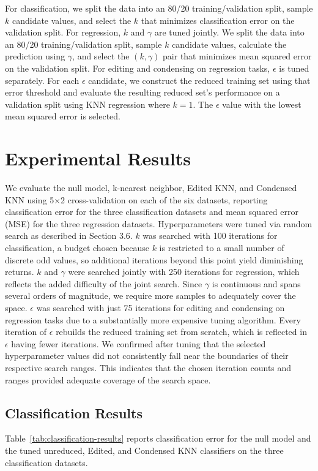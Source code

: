 \documentclass[twoside,11pt]{article}
\begin{document}
For classification, we split the data into an 80/20 training/validation split, sample $k$ candidate values, and select the $k$ that minimizes classification error on the validation split. For regression, $k$ and $\gamma$ are tuned jointly. We split the data into an 80/20 training/validation split, sample $k$ candidate values, calculate the prediction using $\gamma$, and select the $(k,\gamma)$ pair that minimizes mean squared error on the validation split. For editing and condensing on regression tasks, $\epsilon$ is tuned separately. For each $\epsilon$ candidate, we construct the reduced training set using that error threshold and evaluate the resulting reduced set's performance on a validation split using KNN regression where $k=1$. The $\epsilon$ value with the lowest mean squared error is selected.

\section{Experimental Results}
We evaluate the null model, k-nearest neighbor, Edited KNN, and Condensed KNN using 5$\times$2 cross-validation on each of the six datasets, reporting classification error for the three classification datasets and mean squared error (MSE) for the three regression datasets. Hyperparameters were tuned via random search as described in Section 3.6. $k$ was searched with 100 iterations for classification, a budget chosen because $k$ is restricted to a small number of discrete odd values, so additional iterations beyond this point yield diminishing returns. $k$ and $\gamma$ were searched jointly with 250 iterations for regression, which reflects the added difficulty of the joint search. Since $\gamma$ is continuous and spans several orders of magnitude, we require more samples to adequately cover the space. $\epsilon$ was searched with just 75 iterations for editing and condensing on regression tasks due to a substantially more expensive tuning algorithm. Every iteration of $\epsilon$ rebuilds the reduced training set from scratch, which is reflected in $\epsilon$ having fewer iterations. We confirmed after tuning that the selected hyperparameter values did not consistently fall near the boundaries of their respective search ranges. This indicates that the chosen iteration counts and ranges provided adequate coverage of the search space.

\subsection{Classification Results}
Table~\ref{tab:classification-results} reports classification error for the null model and the tuned unreduced, Edited, and Condensed KNN classifiers on the three classification datasets.
\end{document}
